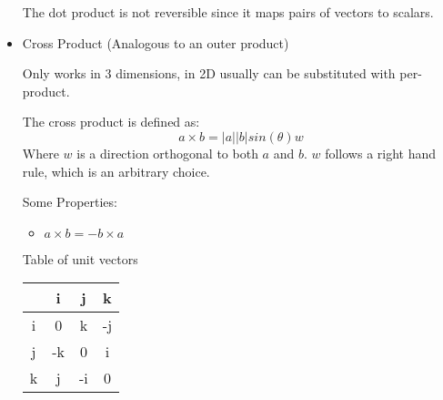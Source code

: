 \documentclass{report}
\begin{document}
\begin{itemize}
\begin{mdframed}
           The dot product is not reversible since it maps pairs
           of vectors to scalars.
        \end{mdframed}
    \item Cross Product (Analogous to an outer product)
        \begin{mdframed}
            Only works in 3 dimensions, in 2D usually can be
            substituted with per-product.

            The cross product is defined as:
            \begin{displaymath}
                a \times b = |a||b|sin(\theta)w
            \end{displaymath}
            Where $w$ is a direction orthogonal to both
            $a$ and $b$. $w$ follows a right hand rule, which
            is an arbitrary choice.

            \begin{center}
            \end{center}
            \pagebreak

            Some Properties:
            \begin{itemize}
                \item $a \times b = -b \times a$
            \end{itemize}
            Table of unit vectors\\
            \begin{tabular}{|c|c|c|c|}
                \hline
                &i & j & k\\
                \hline
                i& 0& k& -j\\
                \hline
                j& -k& 0& i\\
                \hline
                k& j& -i& 0\\
                \hline
            \end{tabular}
            

        \end{mdframed}
\end{itemize}
\end{document}
